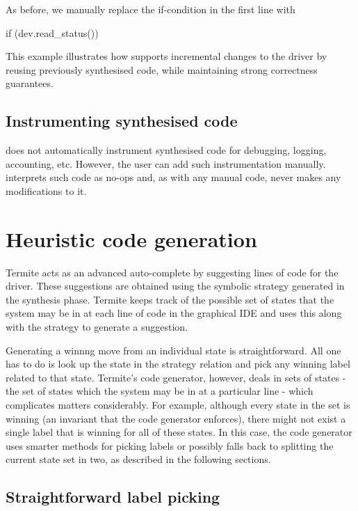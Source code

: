As before, we manually replace the if-condition in the first line with

\begin{tsllisting}
if (dev.read_status())
\end{tsllisting}

This example illustrates how \termite supports incremental changes to the driver by reusing previously synthesised code, while maintaining strong correctness guarantees.

\subsection{Instrumenting synthesised code~~} 
\termite does not automatically instrument synthesised code for debugging, logging, accounting, etc.  However, the user can add such instrumentation manually.  \termite interprets such code as no-ops and, as with any manual code, never makes any modifications to it.

\section{Heuristic code generation}
\label{sec:heuristic_codegen}

Termite acts as an advanced auto-complete by suggesting lines of code for the driver. These suggestions are obtained using the symbolic strategy generated in the synthesis phase. Termite keeps track of the possible set of states that the system may be in at each line of code in the graphical IDE and uses this along with the strategy to generate a suggestion. 

Generating a winnng move from an individual state is straightforward. All one has to do is look up the state in the strategy relation and pick any winning label related to that state. Termite's code generator, however, deals in sets of states - the set of states which the system may be in at a particular line - which complicates matters considerably. For example, although every state in the set is winning (an invariant that the code generator enforces), there might not exist a single label that is winning for all of these states. In this case, the code generator uses smarter methods for picking labels or possibly falls back to splitting the current state set in two, as described in the following sections.

\subsection{Straightforward label picking}

